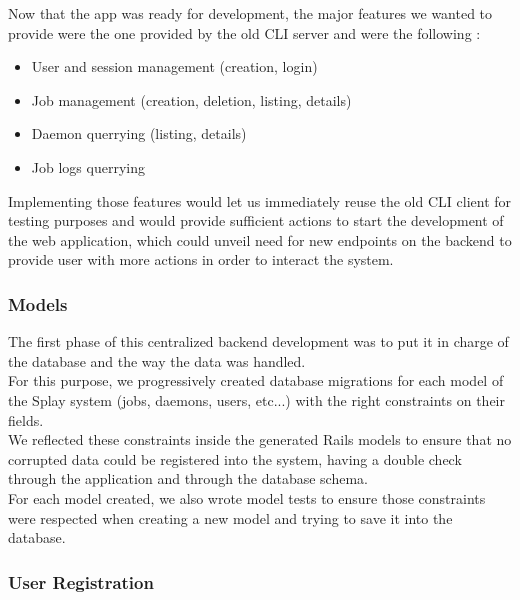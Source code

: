 \documentclass{eplmastersthesis}
\begin{document}
        Now that the app was ready for development, the major features
        we wanted to provide were the one provided by the old CLI server and
        were the following :

        \begin{itemize}
          \item User and session management (creation, login)
          \item Job management (creation, deletion, listing, details)
          \item Daemon querrying (listing, details)
          \item Job logs querrying
        \end{itemize}

        Implementing those features would let us immediately reuse the old
        CLI client for testing purposes and would provide sufficient actions
        to start the development of the web application, which could unveil
        need for new endpoints on the backend to provide user with more
        actions in order to interact the system.\\

        \subsubsection{Models}

          The first phase of this centralized backend development was to
          put it in charge of the database and the way the data was handled.\\

          For this purpose, we progressively created database migrations
          for each model of the Splay system (jobs, daemons, users, etc...)
          with the right constraints on their fields.\\
          We reflected these constraints inside the generated Rails models to
          ensure that no corrupted data could be registered into the system,
          having a double check through the application and through the
          database schema.\\
          For each model created, we also wrote model tests to ensure those
          constraints were respected when creating a new model and trying
          to save it into the database.

        \subsubsection{User Registration}
\end{document}
